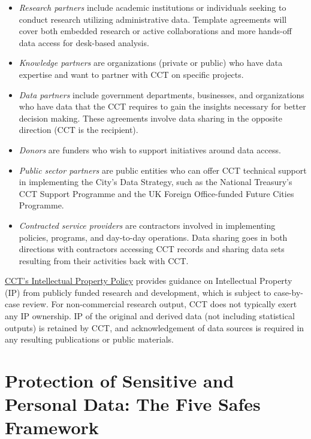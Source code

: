 \documentclass[
]{book}
\providecommand{\tightlist}{%
  \setlength{\itemsep}{0pt}\setlength{\parskip}{0pt}}
\begin{document}
\begin{itemize}
\tightlist
\item
  \emph{Research partners} include academic institutions or individuals seeking to conduct research utilizing administrative data. Template agreements will cover both embedded research or active collaborations and more hands-off data access for desk-based analysis.
\item
  \emph{Knowledge partners} are organizations (private or public) who have data expertise and want to partner with CCT on specific projects.
\item
  \emph{Data partners} include government departments, businesses, and organizations who have data that the CCT requires to gain the insights necessary for better decision making. These agreements involve data sharing in the opposite direction (CCT is the recipient).
\item
  \emph{Donors} are funders who wish to support initiatives around data access.
\item
  \emph{Public sector partners} are public entities who can offer CCT technical support in implementing the City's Data Strategy, such as the National Treasury's CCT Support Programme and the UK Foreign Office-funded Future Cities Programme.
\item
  \emph{Contracted service providers} are contractors involved in implementing policies, programs, and day-to-day operations. Data sharing goes in both directions with contractors accessing CCT records and sharing data sets resulting from their activities back with CCT.
\end{itemize}

\href{https://resource.capetown.gov.za/documentcentre/Documents/Bylaws\%20and\%20policies/Intellectual_Property_Policy.pdf}{CCT's Intellectual Property Policy} provides guidance on Intellectual Property (IP) from publicly funded research and development, which is subject to case-by-case review. For non-commercial research output, CCT does not typically exert any IP ownership. IP of the original and derived data (not including statistical outputs) is retained by CCT, and acknowledgement of data sources is required in any resulting publications or public materials.

\hypertarget{protection-of-sensitive-and-personal-data-the-five-safes-framework-6}{%
\section{Protection of Sensitive and Personal Data: The Five Safes Framework}\label{protection-of-sensitive-and-personal-data-the-five-safes-framework-6}}
\end{document}
